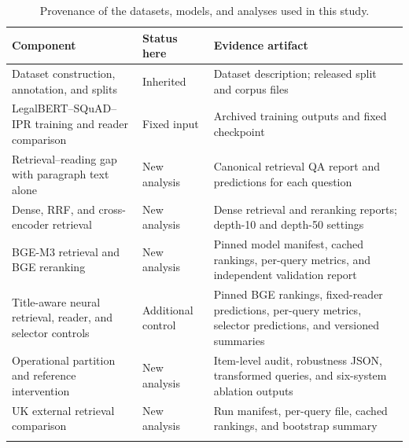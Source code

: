 \documentclass[pdflatex,sn-basic]{sn-jnl}%
\theoremstyle{thmstyleone}%
\theoremstyle{thmstyletwo}%
\theoremstyle{thmstylethree}%
\newcommand{\fixedreader}{LegalBERT--SQuAD--IPR}
\begin{document}
\begin{table}[!htbp]
    \caption{Provenance of the datasets, models, and analyses used in this
    study.}
    \label{tab:analysis_provenance}
    \centering
    \scriptsize
    \setlength{\tabcolsep}{3.5pt}
    \renewcommand{\arraystretch}{1.20}
    \begin{tabular}{@{}
        >{\raggedright\arraybackslash}p{4.0cm}
        >{\raggedright\arraybackslash}p{2.0cm}
        >{\raggedright\arraybackslash}p{6.0cm}@{}}
        \toprule
        Component & Status here & Evidence artifact \\
        \midrule
        Dataset construction, annotation, and splits
        & Inherited
        & Dataset description; released split and corpus files \\
        \addlinespace[2pt]

        \fixedreader{} training and reader comparison
        & Fixed input
        & Archived training outputs and fixed checkpoint \\
        \addlinespace[2pt]

        Retrieval--reading gap with paragraph text alone
        & New analysis
        & Canonical retrieval QA report and predictions for each question \\
        \addlinespace[2pt]

        Dense, RRF, and cross-encoder retrieval
        & New analysis
        & Dense retrieval and reranking reports; depth-10 and depth-50
        settings \\
        \addlinespace[2pt]

        BGE-M3 retrieval and BGE reranking
        & New analysis
        & Pinned model manifest, cached rankings, per-query metrics, and
        independent validation report \\
        \addlinespace[2pt]

        Title-aware neural retrieval, reader, and selector controls
        & Additional control
        & Pinned BGE rankings, fixed-reader predictions, per-query metrics,
        selector predictions, and versioned summaries \\
        \addlinespace[2pt]

        Operational partition and reference intervention
        & New analysis
        & Item-level audit, robustness JSON, transformed queries, and
        six-system ablation outputs \\
        \addlinespace[2pt]

        UK external retrieval comparison
        & New analysis
        & Run manifest, per-query file, cached rankings, and bootstrap
        summary \\
        \addlinespace[2pt]


\end{tabular}
\end{table}
\end{document}
